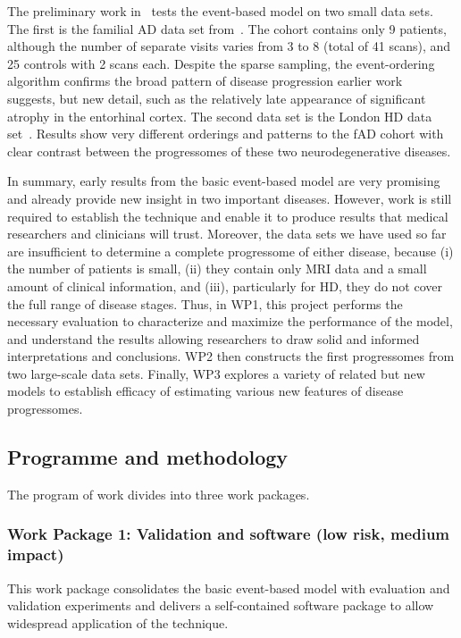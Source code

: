\documentclass[a4paper,11pt]{article}
\begin{document}
The preliminary work in~\cite{FonteijnScience11} tests the event-based
model on two small data sets.  The first is the familial AD data set
from~\cite{RidhaRad07}.  The cohort contains only 9 patients, although
the number of separate visits varies from 3 to 8 (total of 41 scans),
and 25 controls with 2 scans each.  Despite the sparse sampling, the
event-ordering algorithm confirms the broad pattern of disease
progression earlier work~\cite{BraakActaNeuro91,ScahillPNAS02}
suggests, but new detail, such as the relatively late appearance of
significant atrophy in the entorhinal cortex.  The second data set is
the London HD data set~\cite{HenleyJNeurol09}.  Results show very
different orderings and patterns to the fAD cohort with clear contrast
between the progressomes of these two neurodegenerative diseases.

In summary, early results from the basic event-based model are very
promising and already provide new insight in two important diseases.
However, work is still required to establish the technique and enable
it to produce results that medical researchers and clinicians will
trust.  Moreover, the data sets we have used so far are insufficient
to determine a complete progressome of either disease, because (i) the
number of patients is small, (ii) they contain only MRI data and a
small amount of clinical information, and (iii), particularly for HD,
they do not cover the full range of disease stages.  Thus, in WP1,
this project performs the necessary evaluation to characterize and
maximize the performance of the model, and understand the results
allowing researchers to draw solid and informed interpretations and
conclusions.  WP2 then constructs the first progressomes from two
large-scale data sets.  Finally, WP3 explores a variety of related but
new models to establish efficacy of estimating various new features of
disease progressomes.

\subsection*{Programme and methodology}

The program of work divides into three work packages.

\subsubsection*{Work Package 1: Validation and software (low risk, medium
impact)}

This work package consolidates the basic event-based model with
evaluation and validation experiments and delivers a self-contained
software package to allow widespread application of the technique.
\end{document}
